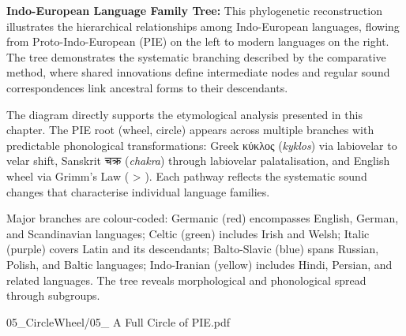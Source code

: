 \begin{SideNotePage}[1.1]{
  \textbf{Indo-European Language Family Tree:} This phylogenetic reconstruction illustrates the hierarchical relationships among Indo-European languages, flowing from Proto-Indo-European (PIE) on the left to modern languages on the right. The tree demonstrates the systematic branching described by the comparative method, where shared innovations define intermediate nodes and regular sound correspondences link ancestral forms to their descendants.

  The diagram directly supports the etymological analysis presented in this chapter. The PIE root  (\QSOpen{}wheel, circle\QSClose{}) appears across multiple branches with predictable phonological transformations: Greek \textgreek{κύκλος} (\emph{kyklos}) via labiovelar to velar shift, Sanskrit \textsanskrit{चक्र} (\emph{chakra}) through labiovelar palatalisation, and English \QSOpen{}wheel\QSClose{} via Grimm's Law ( > ). Each pathway reflects the systematic sound changes that characterise individual language families.

  Major branches are colour-coded: Germanic (red) encompasses English, German, and Scandinavian languages; Celtic (green) includes Irish and Welsh; Italic (purple) covers Latin and its descendants; Balto-Slavic (blue) spans Russian, Polish, and Baltic languages; Indo-Iranian (yellow) includes Hindi, Persian, and related languages. The tree reveals morphological and phonological spread through subgroups. \par
  
}{05_CircleWheel/05_ A Full Circle of PIE.pdf}
\end{SideNotePage}
